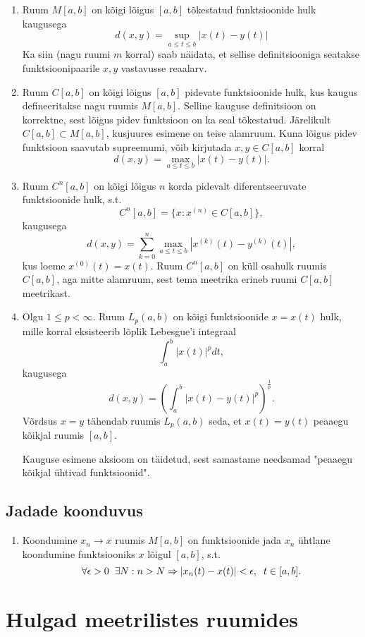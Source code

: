 \documentclass{article}[12pt]
\newcommand{\h}{\hspace{0.2cm}}
\theoremstyle{definition}
\theoremstyle{definition}
\theoremstyle{definition}
\theoremstyle{break}
\begin{document}
\begin{enumerate}
	\item Ruum $M[a,b]$ on kõigi lõigus $[a,b]$ tõkestatud funktsioonide hulk kaugusega
	\[
		d(x,y) = \sup_{a\leq t \leq b} |x(t)-y(t)|
	\]
	Ka siin (nagu ruumi $m$ korral) saab näidata, et sellise definitsiooniga seatakse funktsioonipaarile $x,y$ vastavusse reaalarv.
	\item Ruum $C[a,b]$ on kõigi lõigus $[a,b]$ pidevate funktsioonide hulk, kus kaugus defineeritakse nagu ruumis $M[a,b]$. 
	Selline kauguse definitsioon on korrektne, sest lõigus pidev funktsioon on ka seal tõkestatud.
	Järelikult $C[a,b]\subset M[a,b]$, kusjuures esimene on teise alamruum.
	Kuna lõigus pidev funktsioon saavutab supreemumi, võib kirjutada $x,y\in C[a,b]$ korral
	\[
		d(x,y) = \max_{a\leq t\leq b} |x(t)-y(t)|.
	\]
	\item Ruum $C^n[a,b]$ on kõigi lõigus $n$ korda pidevalt diferentseeruvate funktsioonide hulk, s.t.
	\[
		C^n[a,b] = \{x:x^{(n)}\in C[a,b]\},
	\]
	kaugusega
	\[
		d(x,y) = \sum_{k=0}^n \max_{a\leq t\leq b} |x^{(k)}(t) - y^{(k)}(t)|,
	\]
	kus loeme $x^{(0)}(t) = x(t)$.
	Ruum $C^n[a,b]$ on küll osahulk ruumis $C[a,b]$, aga mitte alamruum, sest tema meetrika erineb ruumi $C[a,b]$ meetrikast.
	\item Olgu $1\leq p < \infty$. Ruum $L_p(a,b)$ on kõigi funktsioonide $x=x(t)$ hulk, mille korral eksisteerib lõplik Lebesgue'i integraal
	\[
		\int_a^b |x(t)|^p dt,
	\]
	kaugusega
	\[
		d(x,y) = \left( \int_a^b |x(t) - y(t)|^p \right)^{\frac{1}{p}}.
	\]
	Võrdsus $x=y$ tähendab ruumis $L_p(a,b)$ seda, et $x(t) = y(t)$ peaaegu kõikjal ruumis $[a,b]$.

	Kauguse esimene aksioom on täidetud, sest samastame needsamad "peaaegu kõikjal ühtivad funktsioonid".
\end{enumerate}

\subsection{Jadade koonduvus}

\begin{enumerate}
	\item Koondumine $x_n\rightarrow x$ ruumis $M[a,b]$ on funktsioonide jada $x_n$ ühtlane koondumine funktsiooniks $x$ lõigul $[a,b]$, s.t.
	\[
		\forall\epsilon>0\h\exists N: n>N\Rightarrow |x_n(t)-x(t)|<\epsilon,\h t\in[a,b].
	\]
\end{enumerate}

\section{Hulgad meetrilistes ruumides}
\end{document}
